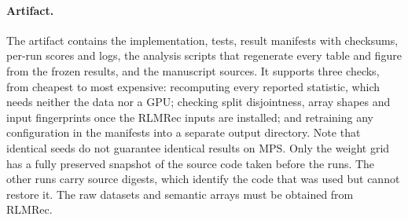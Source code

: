 \documentclass[runningheads]{llncs}
\begin{document}
\paragraph{Artifact.}
The artifact contains the implementation, tests, result manifests with
checksums, per-run scores and logs, the analysis scripts that regenerate every
table and figure from the frozen results, and the manuscript sources. It
supports three checks, from cheapest to most expensive: recomputing every
reported statistic, which needs neither the data nor a GPU; checking split
disjointness, array shapes and input fingerprints once the RLMRec inputs are
installed; and retraining any configuration in the manifests into a separate
output directory. Note that identical seeds do not guarantee identical results
on MPS. Only the weight grid has a fully preserved snapshot of the source code
taken before the runs. The other runs carry source digests, which identify the
code that was used but cannot restore it. The raw datasets and semantic arrays
must be obtained from RLMRec.
\end{document}
